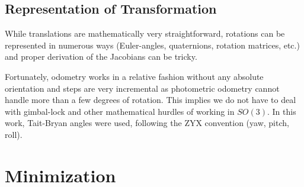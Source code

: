 \subsection{Representation of Transformation}

While translations are mathematically very straightforward, rotations can be
represented in numerous ways (Euler-angles, quaternions, rotation matrices,
etc.) and proper derivation of the Jacobians can be tricky.

Fortunately, odometry works in a relative fashion without any absolute
orientation and steps are very incremental as photometric odometry cannot
handle more than a few degrees of rotation. This implies we do not have to deal
with gimbal-lock and other mathematical hurdles of working in $SO(3)$. In this
work, Tait-Bryan angles were used, following the ZYX convention (yaw, pitch,
roll).




\section{Minimization}

